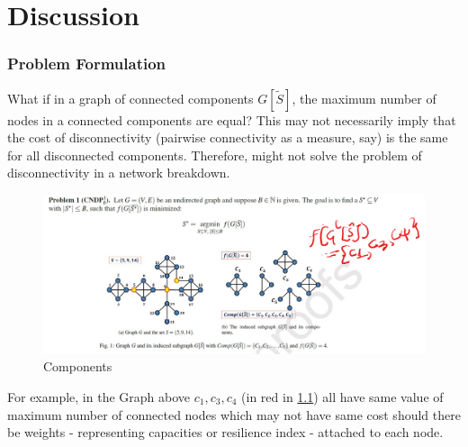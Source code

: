 \chapter{Discussion}
\label{cap:discussion}
\subsection{Problem Formulation}
What if in a graph of connected components $G[\tilde{S}]$, the maximum number of nodes in a connected components are equal? This may not necessarily imply that the cost of disconnectivity (pairwise connectivity as a measure, say) is the same for all disconnected components. Therefore, might not solve the problem of disconnectivity in a network breakdown.
\begin{figure}[htb!]
\centering \includegraphics[width=\textwidth]{graphics/conn_comp.png}
\caption{Components}
\label{fig:conn_comp}
\end{figure}
For example, in the Graph above ${c_1, c_3, c_4}$ (in red in \ref{fig:conn_comp}) all have same value of maximum number of connected nodes which may not have same cost should there be weights - representing capacities or resilience index - attached to each node.
